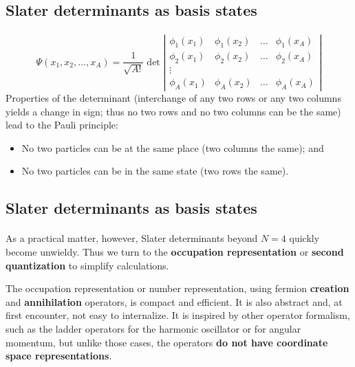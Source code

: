 \subsection*{Slater determinants as basis states}

\paragraph{}
\[
\Psi(x_1, x_2, \ldots, x_A) 
= \frac{1}{\sqrt{A!}} 
\det \left | 
\begin{array}{cccc}
\phi_1(x_1) & \phi_1(x_2) & \ldots & \phi_1(x_A) \\
\phi_2(x_1) & \phi_2(x_2) & \ldots & \phi_2(x_A) \\
 \vdots & & &  \\
\phi_A(x_1) & \phi_A(x_2) & \ldots & \phi_A(x_A) 
\end{array}
\right |
\]
Properties of the determinant (interchange of any two rows or 
any two columns yields a change in sign; thus no two rows and no 
two columns can be the same) lead to the Pauli principle:

\begin{itemize}
\item No two particles can be at the same place (two columns the same); and

\item No two particles can be in the same state (two rows the same).
\end{itemize}

\noindent



\subsection*{Slater determinants as basis states}

\paragraph{}
As a practical matter, however, Slater determinants beyond $N=4$ quickly become 
unwieldy. Thus we turn to the \textbf{occupation representation} or \textbf{second quantization} to simplify calculations. 

The occupation representation or number representation, using fermion \textbf{creation} and \textbf{annihilation} 
operators, is compact and efficient. It is also abstract and, at first encounter, not easy to 
internalize. It is inspired by other operator formalism, such as the ladder operators for 
the harmonic oscillator or for angular momentum, but unlike those cases, the operators \textbf{do not have coordinate space representations}.

